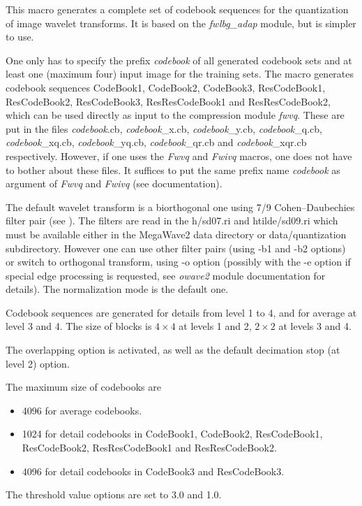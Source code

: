 This macro generates a complete set of codebook sequences for the quantization 
of image wavelet transforms. It is based on the {\em fwlbg\_adap} module, 
but is simpler to use. 

One only has to specify the prefix {\em codebook} of all generated 
codebook sets and at least one (maximum four) input image for the 
training sets. The macro generates codebook sequences 
CodeBook1, CodeBook2, CodeBook3, ResCodeBook1, ResCodeBook2, ResCodeBook3, 
ResResCodeBook1 and ResResCodeBook2, which can be used directly 
as input to the compression module {\em fwvq}. These are put in the files 
{\em codebook}.cb, {\em codebook}\_x.cb, {\em codebook}\_y.cb, 
{\em codebook}\_q.cb, {\em codebook}\_xq.cb, {\em codebook}\_yq.cb, 
{\em codebook}\_qr.cb and {\em codebook}\_xqr.cb respectively. 
However, if one uses the {\em Fwvq} and {\em Fwivq} macros, 
one does not have to bother about these files. It suffices to put 
the same prefix name {\em codebook} as argument of 
{\em Fwvq} and {\em Fwivq} (see documentation). 

The default wavelet transform is a biorthogonal one using 
7/9 Cohen--Daubechies filter pair (see \cite{kn:cdf}). 
The filters are read in the h/sd07.ri and htilde/sd09.ri 
which must be available either in the MegaWave2 data directory or 
data/quantization subdirectory. 
However one can use other filter pairs (using -b1 and -b2 options) 
or switch to orthogonal transform, using -o option 
(possibly with the -e option if special edge processing is requested, 
see {\em owave2} module documentation for details). 
The normalization mode is the default one. 

Codebook sequences are generated for details from level 1 to 4, and 
for average at level 3 and 4. The size of blocks is $4\times 4$ at 
levels 1 and 2, $2\times 2$ at levels 3 and 4.

The overlapping option is activated, as well as the default decimation 
stop (at level 2) option. 

The maximum size of codebooks are 
\begin{itemize} 
\item 4096 for average codebooks. 
\item 1024 for detail codebooks in CodeBook1, CodeBook2, ResCodeBook1, 
ResCodeBook2, ResResCodeBook1 and ResResCodeBook2.
\item 4096 for detail codebooks in CodeBook3 and ResCodeBook3.
\end{itemize}

The threshold value options are set to 3.0 and 1.0. 

